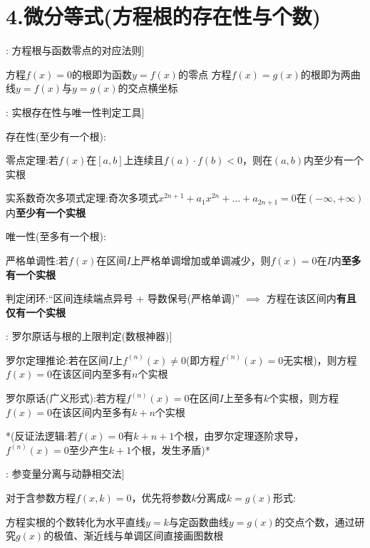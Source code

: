 \documentclass[11pt,a4paper,UTF8]{ctexart}
\begin{document}
\section{4.微分等式(方程根的存在性与个数)}

\begin{thmbox}[原理[1]: 方程根与函数零点的对应法则]

方程$f(x) = 0$的根即为函数$y = f(x)$的零点 方程$f(x) = g(x)$的根即为两曲线$y = f(x)$与$y = g(x)$的交点横坐标 

\end{thmbox}
\begin{thmbox}[原理[2]: 实根存在性与唯一性判定工具]

存在性(至少有一个根):

零点定理:若$f(x)$在$[a, b]$上连续且$f(a) \cdot f(b) < 0$，则在$(a, b)$内至少有一个实根 

实系数奇次多项式定理:奇次多项式$x^{2n+1} + a_1 x^{2n} + \dots + a_{2n+1} = 0$在$(-\infty, +\infty)$内\textbf{至少有一个实根} 

唯一性(至多有一个根):

  严格单调性:若$f(x)$在区间$I$上严格单调增加或单调减少，则$f(x) = 0$在$I$内\textbf{至多有一个实根} 

  判定闭环:“区间连续端点异号 + 导数保号(严格单调)” $\implies$ 方程在该区间内\textbf{有且仅有一个实根} 

\end{thmbox}
\begin{thmbox}[原理[3]: 罗尔原话与根的上限判定(数根神器)]

罗尔定理推论:若在区间$I$上$f^{(n)}(x) \neq 0$(即方程$f^{(n)}(x) = 0$无实根)，则方程$f(x) = 0$在该区间内\textit{}至多有$n$个实根\textit{} 

罗尔原话(广义形式):若方程$f^{(n)}(x) = 0$在区间$I$上至多有$k$个实根，则方程$f(x) = 0$在该区间内\textit{}至多有$k + n$个实根\textit{} 

*(反证法逻辑:若$f(x) = 0$有$k+n+1$个根，由罗尔定理逐阶求导，$f^{(n)}(x) = 0$至少产生$k+1$个根，发生矛盾)* 

\end{thmbox}
\begin{thmbox}[原理[4]: 参变量分离与动静相交法]

对于含参数方程$f(x, k) = 0$，优先将参数$k$分离成$k = g(x)$形式:

方程实根的个数转化为水平直线$y = k$与定函数曲线$y = g(x)$的交点个数，通过研究$g(x)$的极值、渐近线与单调区间直接画图数根 

\end{thmbox}
\end{document}
